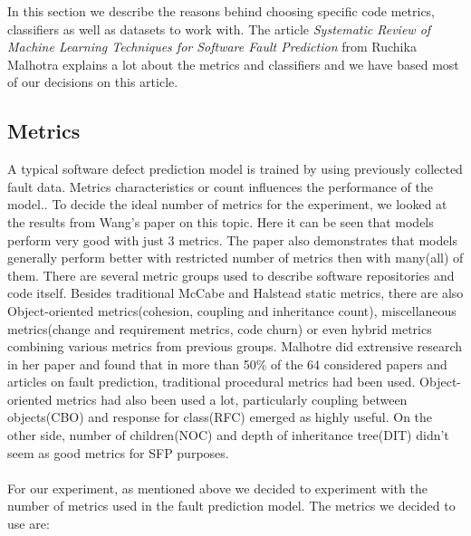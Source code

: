 In this section we describe the reasons behind choosing specific code metrics, classifiers as well as datasets to work with. The article \textit{Systematic Review of Machine Learning Techniques for Software Fault Prediction}\cite{malhotra2015systematic} from Ruchika Malhotra explains a lot about the metrics and classifiers and we have based most of our decisions on this article.
\subsection{Metrics}
A typical software defect prediction model is trained by using previously collected fault data. Metrics characteristics or count influences the performance of the model.\cite{wang2011many}. To decide the ideal number of metrics for the experiment, we looked at the results from Wang's paper on this topic\cite{wang2011many}. Here it can be seen that models perform very good with just 3 metrics. The paper also demonstrates that models generally perform better with restricted number of metrics then with many(all) of them. There are several metric groups used to describe software repositories and code itself. Besides traditional McCabe and Halstead static metrics, there are also Object-oriented metrics(cohesion, coupling and inheritance count), miscellaneous metrics(change and requirement metrics, code churn) or even hybrid metrics combining various metrics from previous groups. Malhotre did extrensive research in her paper and found that in more than 50\% of the 64 considered papers and articles on fault prediction, traditional procedural metrics had been used. Object-oriented metrics had also been used a lot, particularly coupling between objects(CBO) and response for class(RFC) emerged as highly useful. On the other side, number of children(NOC) and depth of inheritance tree(DIT) didn't seem as
good metrics for SFP purposes\cite[p.~15]{malhotra2015systematic}.\\\\
For our experiment, as mentioned above we decided to experiment with the number of metrics used in the fault prediction model. The metrics we decided to use are:\\
